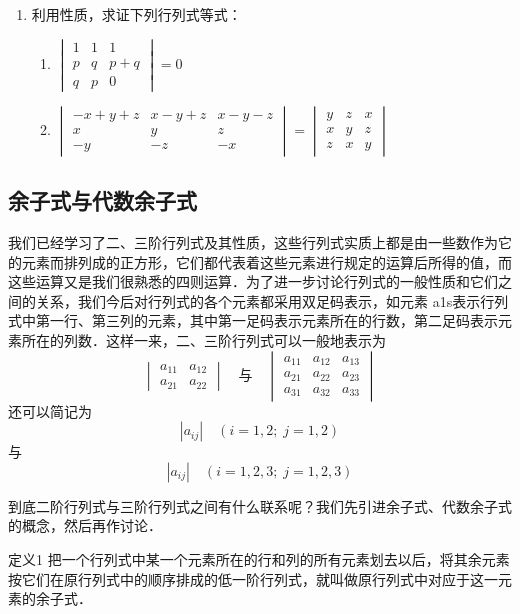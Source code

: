 \begin{ex}
\begin{enumerate}
\item 利用性质，求证下列行列式等式：
\begin{enumerate}
    \item $\begin{vmatrix}
        1&1&1\\p&q&p+q\\q&p&0
    \end{vmatrix}=0$
    \item $\begin{vmatrix}
        -x+y+z&x-y+z&x-y-z\\
        x&y&z\\
        -y&-z&-x
    \end{vmatrix}=\begin{vmatrix}
        y&z&x\\x&y&z\\z&x&y
    \end{vmatrix}$
\end{enumerate}
\end{enumerate}
\end{ex}

\subsection{余子式与代数余子式}

我们已经学习了二、三阶行列式及其性质，这些行列式实质上都是由一些数作为它的元素而排列成的正方形，它们都代表着这些元素进行规定的运算后所得的值，而这些运算又是我们很熟悉的四则运算．为了进一步讨论行列式的一般性质和它们之间的关系，我们今后对行列式的各个元素都采用双足码表示，如元素 a1s表示行列式中第一行、第三列的元素，其中第一足码表示元素所在的行数，第二足码表示元素所在的列数．这样一来，二、三阶行列式可以一般地表示为
\[\begin{vmatrix}
    a_{11}&a_{12}\\a_{21}&a_{22}
\end{vmatrix}\quad\text{与}\quad  \begin{vmatrix}
    a_{11}&a_{12}&a_{13}\\
    a_{21}&a_{22}&a_{23}\\
    a_{31}&a_{32}&a_{33}
\end{vmatrix}\]
还可以简记为
\[|a_{ij}|\quad (i=1,2;\; j=1,2)\]
与
\[|a_{ij}|\quad (i=1,2,3;\; j=1,2,3)\]

到底二阶行列式与三阶行列式之间有什么联系呢？我们先引进余子式、代数余子式的概念，然后再作讨论．

\begin{blk}{定义1}
    把一个行列式中某一个元素所在的行和列的所有元素划去以后，将其余元素按它们在原行列式中的顺序排成的低一阶行列式，就叫做原行列式中对应于这一元素的余子式．
\end{blk}

